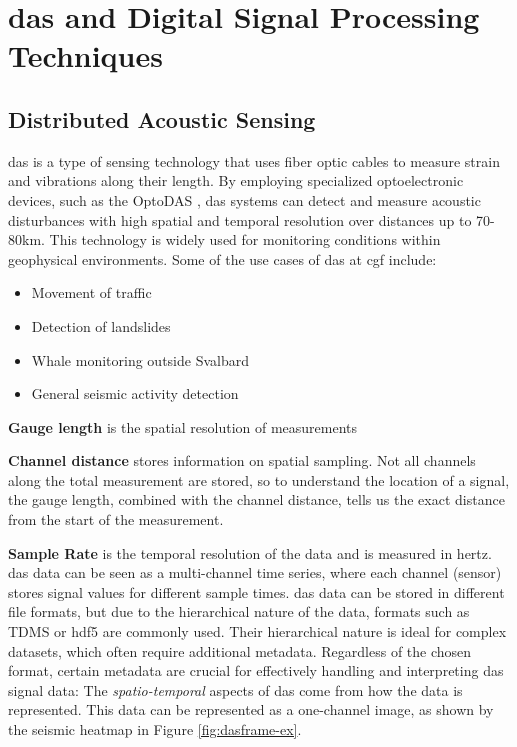 \section{\acrshort{das} and Digital Signal Processing Techniques}
\label{back:dsp}

\subsection{Distributed Acoustic Sensing}
\label{back:das}

\acrfull{das} is a type of sensing technology that uses fiber optic cables to measure strain and vibrations along their length. By employing specialized optoelectronic devices, such as the OptoDAS \cite{asn_optodas}, \acrshort{das} systems can detect and measure acoustic disturbances with high spatial and temporal resolution over distances up to 70-80km. This technology is widely used for monitoring conditions within geophysical environments. Some of the use cases of \acrshort{das} at \acrshort{cgf} include:

\begin{itemize}
    \item Movement of traffic
    \item Detection of landslides
    \item Whale monitoring outside Svalbard
    \item General seismic activity detection
\end{itemize}

\textbf{Gauge length} is the spatial resolution of measurements

\textbf{Channel distance} stores information on spatial sampling. Not all channels along the total measurement are stored, so to understand the location of a signal, the gauge length, combined with the channel distance, tells us the exact distance from the start of the measurement.

\textbf{Sample Rate} is the temporal resolution of the data and is measured in hertz. \\

\acrshort{das} data can be seen as a multi-channel time series, where each channel (sensor) stores signal values for different sample times.   \acrshort{das} data can be stored in different file formats, but due to the hierarchical nature of the data, formats such as TDMS \cite{10.1145/800196.805973} or \acrshort{hdf5} are commonly used. Their hierarchical nature is ideal for complex datasets, which often require additional metadata. Regardless of the chosen format, certain metadata are crucial for effectively handling and interpreting \acrshort{das} signal data:
The \textit{spatio-temporal} aspects of \acrshort{das} come from how the data is represented. This data can be represented as a one-channel image, as shown by the seismic heatmap in Figure \ref{fig:dasframe-ex}. 

